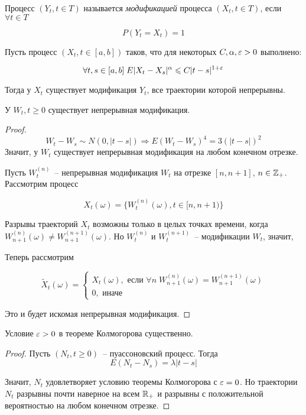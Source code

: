 \begin{definition}
Процесс $(Y_t, t \in T)$ называется \emph{модификацией} процесса $(X_t, t \in T)$, если
$\forall t \in T$

$$P(Y_t = X_t) = 1$$
\end{definition}
\begin{theorem}
Пусть процесс $(X_t, t \in [a,b])$ таков, что для некоторых $C, \alpha, \varepsilon > 0$ выполнено:

$$\forall t, s \in [a,b] \; E|X_t-X_s|^\alpha \leqslant C|t-s|^{1+\varepsilon}$$

Тогда у $X_t$ существует модификация $Y_t$, все траектории которой непрерывны.
\end{theorem}
\begin{corollary}
У $W_t, t \geq 0$ существует непрерывная модификация.
\end{corollary}
\begin{proof}
$$W_t-W_s \sim N(0, |t-s|) \Rightarrow E(W_t-W_s)^4 = 3(|t-s|)^2$$
Значит, у $W_t$ существует непрерывная модификация на любом конечном отрезке.

Пусть $W_t^{(n)}$~-- непрерывная модификация $W_t$ на отрезке $[n, n+1]$, $n \in \mathbb{Z}_+$.
Рассмотрим процесс

$$X_t(\omega) = \{W_t^{(n)}(\omega), t \in [n, n+1)\}$$

Разрывы траекторий $X_t$ возможны только в целых точках времени, когда $W_{n+1}^{(n)}(\omega) \neq
W_{n+1}^{(n+1)}(\omega)$. Но $W_t^{(n)}$ и $W_t^{(n+1)}$~-- модификации $W_t$, значит,


Теперь рассмотрим

$$\tilde X_t(\omega) = \left\lbrace
\begin{array}{l}
X_t(\omega), \text{ если } \forall n \; W_{n+1}^{(n)}(\omega) = W_{n+1}^{(n+1)}(\omega) \\
0, \text{ иначе }
\end{array}
\right.
$$

Это и будет искомая непрерывная модификация.
\end{proof}

\begin{remark}
Условие $\varepsilon > 0$ в теореме Колмогорова существенно.
\end{remark}
\begin{proof}
Пусть $(N_t, t \geq 0)$~-- пуассоновский процесс. Тогда
$$E(N_t-N_s) = \lambda|t-s|$$

Значит, $N_t$ удовлетворяет условию теоремы Колмогорова с $\varepsilon = 0$. Но траектории
$N_t$ разрывны почти наверное на всем $\mathbb{R}_+$ и разрывны с положительной вероятностью на любом конечном отрезке.
\end{proof}

